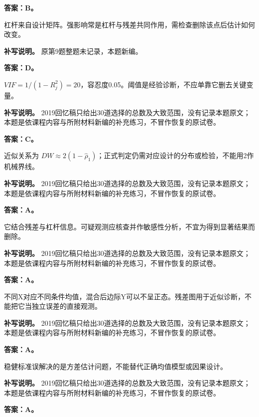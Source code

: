 \textbf{答案：B。}

杠杆来自设计矩阵。强影响常是杠杆与残差共同作用，需检查删除该点后估计如何改变。


\textbf{补写说明。} 原第9题整题未记录，本题新编。



\textbf{答案：D。}

\(VIF=1/(1-R_j^2)=20\)，容忍度0.05。阈值是经验诊断，不应单靠它删去关键变量。


\textbf{补写说明。} 2019回忆稿只给出30道选择的总数及大致范围，没有记录本题原文；本题是依课程内容与所附材料新编的补充练习，不冒作恢复的原试卷。



\textbf{答案：C。}

近似关系为 \(DW\approx2(1-\hat\rho_1)\)；正式判定仍需对应设计的分布或检验，不能用2作机械界线。


\textbf{补写说明。} 2019回忆稿只给出30道选择的总数及大致范围，没有记录本题原文；本题是依课程内容与所附材料新编的补充练习，不冒作恢复的原试卷。



\textbf{答案：A。}

它结合残差与杠杆信息。可疑观测应核查并作敏感性分析，不宜为得到显著结果而删除。


\textbf{补写说明。} 2019回忆稿只给出30道选择的总数及大致范围，没有记录本题原文；本题是依课程内容与所附材料新编的补充练习，不冒作恢复的原试卷。



\textbf{答案：A。}

不同X对应不同条件均值，混合后边际Y可以不呈正态。残差图用于近似诊断，不能把它当独立误差的直接观测。


\textbf{补写说明。} 2019回忆稿只给出30道选择的总数及大致范围，没有记录本题原文；本题是依课程内容与所附材料新编的补充练习，不冒作恢复的原试卷。



\textbf{答案：A。}

稳健标准误解决的是方差估计问题，不能替代正确均值模型或因果设计。


\textbf{补写说明。} 2019回忆稿只给出30道选择的总数及大致范围，没有记录本题原文；本题是依课程内容与所附材料新编的补充练习，不冒作恢复的原试卷。



\textbf{答案：A。}

